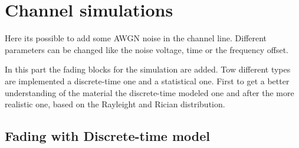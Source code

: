 \section{Channel simulations}

Here its possible to add some AWGN noise in the channel line. Different parameters can be changed like the noise voltage, time or the frequency offset.

In this part the fading blocks for the simulation are added. Tow different types are implemented a discrete-time one and a statistical one. First to get a better understanding of the material the discrete-time modeled one and after the more realistic one, based on the Rayleight and Rician distribution.


%
%

\subsection{Fading with Discrete-time model}

